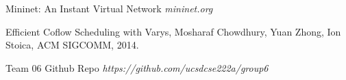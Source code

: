 \documentclass{article}
\begin{document}

\begin{thebibliography}{10}

Mininet: An Instant Virtual Network \textit{mininet.org}

Efficient Coflow Scheduling with Varys, Mosharaf Chowdhury, Yuan Zhong, Ion Stoica, ACM SIGCOMM, 2014.

Team 06 Github Repo \textit{https://github.com/ucsdcse222a/group6}

\end{thebibliography}
\end{document}
